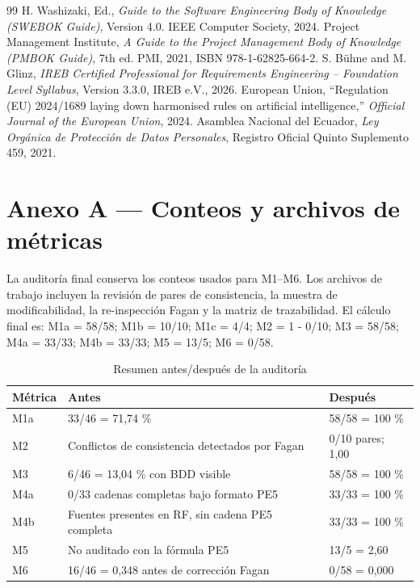 \documentclass[12pt,a4paper]{article}
\begin{document}
\begin{thebibliography}{99}
 H. Washizaki, Ed., \emph{Guide to the Software Engineering Body of Knowledge (SWEBOK Guide)}, Version 4.0. IEEE Computer Society, 2024.
 Project Management Institute, \emph{A Guide to the Project Management Body of Knowledge (PMBOK Guide)}, 7th ed. PMI, 2021, ISBN 978-1-62825-664-2.
 S. Bühne and M. Glinz, \emph{IREB Certified Professional for Requirements Engineering -- Foundation Level Syllabus}, Version 3.3.0, IREB e.V., 2026.
 European Union, ``Regulation (EU) 2024/1689 laying down harmonised rules on artificial intelligence,'' \emph{Official Journal of the European Union}, 2024.
 Asamblea Nacional del Ecuador, \emph{Ley Orgánica de Protección de Datos Personales}, Registro Oficial Quinto Suplemento 459, 2021.
\end{thebibliography}
\clearpage

\section*{Anexo A — Conteos y archivos de métricas}
La auditoría final conserva los conteos usados para M1--M6. Los archivos de trabajo incluyen la revisión de pares de consistencia, la muestra de modificabilidad, la re-inspección Fagan y la matriz de trazabilidad. El cálculo final es: M1a = 58/58; M1b = 10/10; M1c = 4/4; M2 = 1 - 0/10; M3 = 58/58; M4a = 33/33; M4b = 33/33; M5 = 13/5; M6 = 0/58.

\begin{table}[H]\centering\caption{Resumen antes/después de la auditoría}\begin{tabularx}{\textwidth}{p{}X X}\toprule
\textbf{Métrica}&\textbf{Antes}&\textbf{Después}\\\midrule
M1a&33/46 = 71,74 \%&58/58 = 100 \%\\
M2&Conflictos de consistencia detectados por Fagan&0/10 pares; 1,00\\
M3&6/46 = 13,04 \% con BDD visible&58/58 = 100 \%\\
M4a&0/33 cadenas completas bajo formato PE5&33/33 = 100 \%\\
M4b&Fuentes presentes en RF, sin cadena PE5 completa&33/33 = 100 \%\\
M5&No auditado con la fórmula PE5&13/5 = 2,60\\
M6&16/46 = 0,348 antes de corrección Fagan&0/58 = 0,000\\\bottomrule
\end{tabularx}\end{table}
\clearpage
\end{document}
